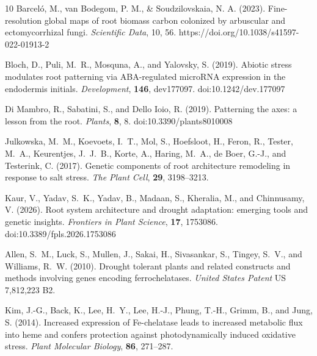 \documentclass[unnumsec,webpdf,contemporary,large]{oup-authoring-template}%
\theoremstyle{thmstyleone}%
\theoremstyle{thmstyletwo}%
\theoremstyle{thmstylethree}%
\begin{document}
\begin{thebibliography}{10}
Barceló, M., van Bodegom, P. M., \& Soudzilovskaia, N. A. (2023).
Fine-resolution global maps of root biomass carbon colonized by arbuscular and ectomycorrhizal fungi.
\textit{Scientific Data}, 10, 56.
https://doi.org/10.1038/s41597-022-01913-2

Bloch, D., Puli, M.~R., Mosquna, A., and Yalovsky, S. (2019).
Abiotic stress modulates root patterning via ABA-regulated microRNA expression in the endodermis initials.
\textit{Development}, \textbf{146}, dev177097.
doi:10.1242/dev.177097

Di Mambro, R., Sabatini, S., and Dello Ioio, R. (2019).
Patterning the axes: a lesson from the root.
\textit{Plants}, \textbf{8}, 8.
doi:10.3390/plants8010008

Julkowska, M.~M., Koevoets, I.~T., Mol, S., Hoefsloot, H., Feron, R., Tester, M.~A., Keurentjes, J.~J.~B., Korte, A., Haring, M.~A., de Boer, G.-J., and Testerink, C. (2017).
Genetic components of root architecture remodeling in response to salt stress.
\textit{The Plant Cell}, \textbf{29}, 3198--3213.

Kaur, V., Yadav, S.~K., Yadav, B., Madaan, S., Kheralia, M., and Chinnusamy, V. (2026).
Root system architecture and drought adaptation: emerging tools and genetic insights.
\textit{Frontiers in Plant Science}, \textbf{17}, 1753086.
doi:10.3389/fpls.2026.1753086


Allen, S.~M., Luck, S., Mullen, J., Sakai, H., Sivasankar, S., Tingey, S.~V., and Williams, R.~W. (2010).
Drought tolerant plants and related constructs and methods involving genes encoding ferrochelatases.
\textit{United States Patent} US 7,812,223 B2.

Kim, J.-G., Back, K., Lee, H.~Y., Lee, H.-J., Phung, T.-H., Grimm, B., and Jung, S. (2014).
Increased expression of Fe-chelatase leads to increased metabolic flux into heme and confers protection against photodynamically induced oxidative stress.
\textit{Plant Molecular Biology}, \textbf{86}, 271--287.


\end{thebibliography}
\end{document}
